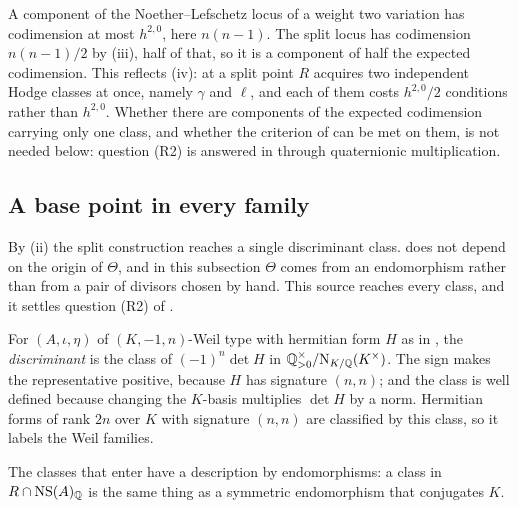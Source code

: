 \begin{remark}
\label{rem:nlcodim}
A component of the Noether--Lefschetz locus of a weight two variation has
codimension at most $h^{2,0}$, here $n(n-1)$. The split locus has codimension
$n(n-1)/2$ by (iii), half of that, so it is a
component of half the expected codimension. This reflects
(iv): at a split point $R$ acquires two independent Hodge
classes at once, namely $\gamma$ and $\ell$, and each of them costs
$h^{2,0}/2$ conditions rather than $h^{2,0}$. Whether there are components
of the expected codimension carrying only one class, and whether the
criterion of  can be met on them, is not needed
below: question (R2) is answered in 
through quaternionic multiplication.
\end{remark}

\subsection{A base point in every family}\label{ssec:everyfamily}

By (ii) the split construction reaches a single
discriminant class.  does not depend on the origin of
$\Theta$, and in this subsection $\Theta$ comes from an endomorphism rather
than from a pair of divisors chosen by hand. This source reaches every class,
and it settles question (R2) of .

\begin{definition}[Discriminant]\label{def:disc}
For $(A,\iota,\eta)$ of $(K,-1,n)$-Weil type with hermitian form $H$ as in
, the \emph{discriminant} is the class of
$(-1)^{n}\det H$ in $\mathbb{Q}^{\times}_{>0}/\mathrm{N}_{K/\mathbb{Q}}(K^{\times})$. The sign
makes the representative positive, because $H$ has signature $(n,n)$; and the
class is well defined because changing the $K$-basis multiplies $\det H$ by a
norm. Hermitian forms of rank $2n$ over $K$ with signature $(n,n)$ are
classified by this class, so it labels the Weil families.
\end{definition}

The classes that enter  have a description by
endomorphisms: a class in $R\cap\mathrm{NS}(A)_{\mathbb{Q}}$ is the same thing as a
symmetric endomorphism that conjugates $K$.

